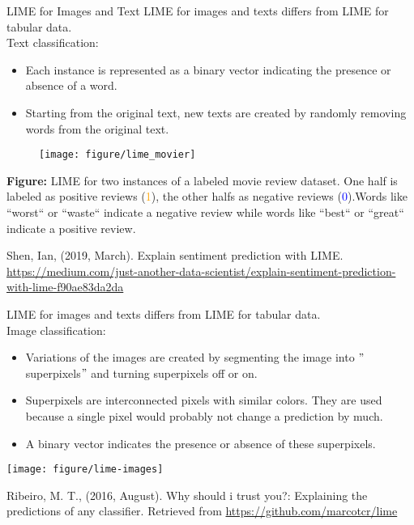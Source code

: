 \documentclass[11pt,compress,t,notes=noshow, xcolor=table]{beamer}
\begin{document}
\begin{vbframe}{LIME for Images and Text}
LIME for images and texts differs from LIME for tabular data. \\[0.2cm]
Text classification: 
\begin{itemize}
    \item Each instance is represented as a binary vector indicating the presence or absence of a word.
  \item Starting from the original text, new texts are created by randomly removing words from the original text. 
\end{itemize}

\begin{figure}
\begin{center}
 \texttt{[image: figure/lime\_movier]}
\end{center}
\end{figure}


 \scriptsize{\textbf{Figure:} LIME for two instances of a labeled movie review dataset. One half is labeled as positive reviews (\textcolor{orange}{1}), 
the other halfs as negative reviews (\textcolor{blue}{0}).Words like ``worst`` or ``waste`` indicate a negative review while words like ``best`` or ``great`` indicate a positive review.}

\vspace{0.3cm}
{\tiny{Shen, Ian, (2019, March). Explain sentiment prediction with LIME.
\url{https://medium.com/just-another-data-scientist/explain-sentiment-prediction-with-lime-f90ae83da2da}}\par}

\framebreak

\normalsize
LIME for images and texts differs from LIME for tabular data. \\[0.2cm]
Image classification: 
  \begin{itemize}
  \item Variations of the images are created by segmenting the image into $"$superpixels$"$ and turning superpixels off or on. 
  \item Superpixels are interconnected pixels with similar colors. They are used because a single pixel would probably not change a prediction by much.
  \item A binary vector indicates the presence or absence of these superpixels.
\end{itemize}
\vspace{-0.3cm}
\begin{center}
 \texttt{[image: figure/lime-images]}
\end{center}
\vspace{-0.3cm}
\tiny{Ribeiro, M. T., (2016, August). Why should i trust you?: Explaining the predictions of any classifier. Retrieved from \url{https://github.com/marcotcr/lime}\par}
\end{vbframe}

\endlecture
\end{document}
